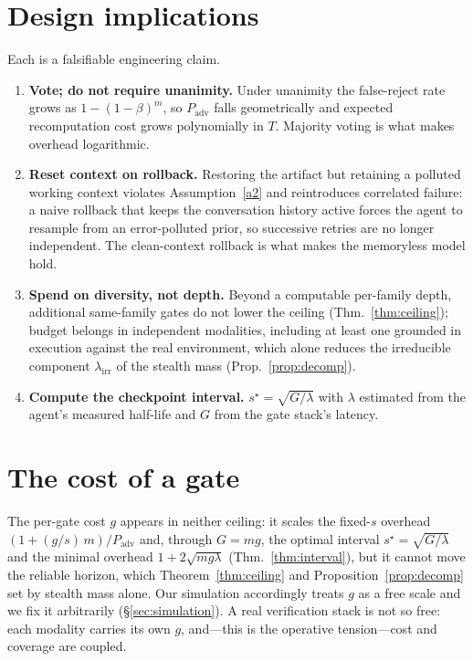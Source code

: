 \documentclass[11pt]{article}
\theoremstyle{remark}
\newcommand{\lirr}{\lambda_{\mathrm{irr}}}
\newcommand{\Padv}{P_{\mathrm{adv}}}
\begin{document}
\section{Design implications}\label{sec:design}
Each is a falsifiable engineering claim.
\begin{enumerate}[leftmargin=1.6em,itemsep=3pt]
\item \textbf{Vote; do not require unanimity.} Under unanimity the false-reject rate grows as
$1-(1-\beta)^m$, so $\Padv$ falls geometrically and expected recomputation cost grows polynomially
in $T$.
Majority voting is what makes overhead logarithmic.
\item \textbf{Reset context on rollback.} Restoring the artifact but retaining a polluted working
context violates Assumption~\ref{a2} and reintroduces correlated failure: a naive rollback that
keeps the conversation history active forces the agent to resample from an error-polluted prior,
so successive retries are no longer independent.
The clean-context
rollback is what makes the memoryless model hold.
\item \textbf{Spend on diversity, not depth.} Beyond a computable per-family depth, additional
same-family gates do not lower the ceiling (Thm.~\ref{thm:ceiling});
budget belongs in independent
modalities, including at least one grounded in execution against the real environment, which alone
reduces the irreducible component $\lirr$ of the stealth mass (Prop.~\ref{prop:decomp}).
\item \textbf{Compute the checkpoint interval.} $s^\star=\sqrt{G/\lambda}$ with $\lambda$ estimated
from the agent's measured half-life and $G$ from the gate stack's latency.
\end{enumerate}

\section{The cost of a gate}\label{sec:gatecost}
The per-gate cost $g$ appears in neither ceiling: it scales the fixed-$s$ overhead
$(1+(g/s)\,m)/\Padv$ and, through
$G=mg$, the optimal interval $s^\star=\sqrt{G/\lambda}$ and the minimal overhead
$1+2\sqrt{mg\lambda}$ (Thm.~\ref{thm:interval}), but it cannot move the reliable horizon, which
Theorem~\ref{thm:ceiling} and Proposition~\ref{prop:decomp} set by stealth mass alone.
Our
simulation accordingly treats $g$ as a free scale and we fix it arbitrarily (\S\ref{sec:simulation}).
A real verification stack is not so free: each modality carries its own $g$, and---this is the
operative tension---cost and coverage are coupled.
\end{document}

